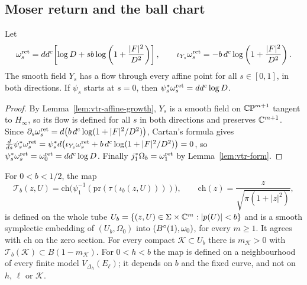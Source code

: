 \subsection{Moser return and the ball chart}\label{sec:vtr-return}

\begin{proposition}\label{prop:vtr-return}
Let
\[
 \omega_s^{\rm ret}=dd^c\!\left[\log D+sb\log\left(1+\frac{|F|^2}{D^2}\right)\right],\qquad
 \iota_{Y_s}\omega_s^{\rm ret}=-b\,d^c\log\left(1+\frac{|F|^2}{D^2}\right).
\]
The smooth field $Y_s$ has a flow through every affine point for all $s\in[0,1]$, in both directions.
If $\psi_s$ starts at $s=0$, then $\psi_s^*\omega_s^{\rm ret}=dd^c\log D$.
\end{proposition}

\begin{proof}
By Lemma~\ref{lem:vtr-affine-growth}, $Y_s$ is a smooth field on $\mathbb{CP}^{m+1}$ tangent to $H_\infty$, so its flow is defined for all
$s$ in both directions and preserves $\mathbb{C}^{m+1}$. Since
$\partial_s\omega^{\rm ret}_s=d\bigl(b\,d^c\log(1+|F|^2/D^2)\bigr)$, Cartan's formula gives
$\frac d{ds}\psi_s^*\omega^{\rm ret}_s=\psi_s^*d\bigl(\iota_{Y_s}\omega^{\rm ret}_s+b\,d^c\log(1+|F|^2/D^2)\bigr)=0$, so
$\psi_s^*\omega_s^{\rm ret}=\omega^{\rm ret}_0=dd^c\log D$. Finally $j_1^*\Omega_b=\omega^{\rm ret}_1$ by Lemma~\ref{lem:vtr-form}.
\end{proof}

\begin{theorem}\label{thm:vtr-transfer}\label{thm:qdr-transfer}
For $0<b<1/2$, the map
\[
 \mathcal T_b(z,U)=\mathrm{ch}\bigl(\psi_1^{-1}(\mathrm{pr}(\tau(\iota_b(z,U))))\bigr),\qquad
 \mathrm{ch}(z)=\frac{z}{\sqrt{\pi(1+|z|^2)}},
\]
is defined on the whole tube $U_b=\{(z,U)\in\Sigma\times\mathbb{C}^m:|p(U)|<b\}$ and is a smooth symplectic embedding of
$(U_b,\Omega_0)$ into $(B^{\circ}(1),\omega_0)$, for every $m\ge1$. It agrees with $\mathrm{ch}$ on the zero section. For every compact
$\mathcal K\subset U_b$ there is $m_{\mathcal K}>0$ with $\mathcal T_b(\mathcal K)\subset B(1-m_{\mathcal K})$. For $0<h<b$ the map is
defined on a neighbourhood of every finite model $V_{\Delta_h}(E_\ell)$; it depends on $b$ and the fixed curve, and not on
$h$, $\ell$ or $\mathcal K$.
\end{theorem}


